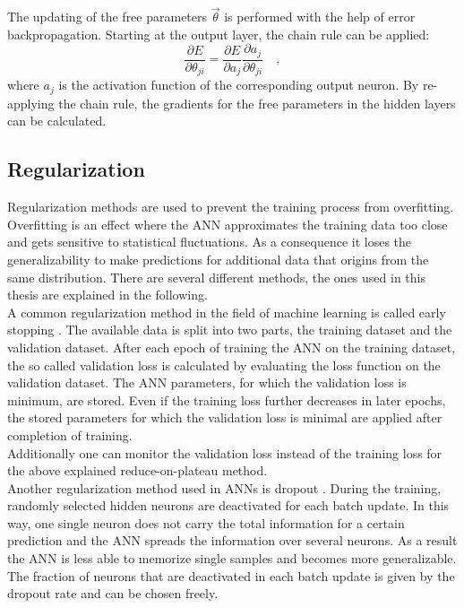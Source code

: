 The updating of the free parameters $\vec{\theta}$ is performed with the help of error backpropagation. Starting at the output layer, the chain rule can be applied:
\begin{equation}
\frac{\partial E}{\partial \theta_{ji}} = \frac{\partial E}{\partial a_j} \frac{\partial a_j}{\partial \theta_{ji}} \quad ,
\end{equation}
where $a_j$ is the activation function of the corresponding output neuron. By re-applying the chain rule, the gradients for the free parameters in the hidden layers can be calculated. 

\subsection{Regularization}
Regularization methods are used to prevent the training process from overfitting. Overfitting is an effect where the ANN approximates the training data too close and gets sensitive to statistical fluctuations. As a consequence it loses the generalizability to make predictions for additional data that origins from the same distribution. There are several different methods, the ones used in this thesis are explained in the following.\\

A common regularization method in the field of machine learning is called early stopping \cite{EarlyStopping}. The available data is split into two parts, the training dataset and the validation dataset. After each epoch of training the ANN on the training dataset, the so called validation loss is calculated by evaluating the loss function on the validation dataset. The ANN parameters, for which the validation loss is minimum, are stored. Even if the training loss further decreases in later epochs, the stored parameters for which the validation loss is minimal are applied after completion of training.\\

Additionally one can monitor the validation loss instead of the training loss for the above explained reduce-on-plateau method. \\

Another regularization method used in ANNs is dropout \cite{dropout}. During the training, randomly selected hidden neurons are deactivated for each batch update. In this way, one single neuron does not carry the total information for a certain prediction and the ANN spreads the information over several neurons. As a result the ANN is less able to memorize single samples and becomes more generalizable. The fraction of neurons that are deactivated in each batch update is given by the dropout rate and can be chosen freely. \\

